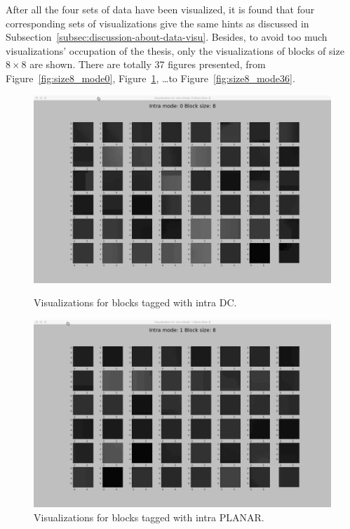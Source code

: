 After all the four sets of data have been visualized,
it is found that four corresponding sets of visualizations
give the same hints as discussed in
Subsection~\ref{subsec:discussion-about-data-visu}.
Besides, to avoid too much visualizations' occupation of the thesis,
only the visualizations of blocks of size $8\times8$
are shown.
There are totally 37 figures presented,
from Figure~\ref{fig:size8_mode0}, Figure~\ref{fig:size8_mode1},
\ldots to Figure~\ref{fig:size8_mode36}.

\begin{figure}[H]
    
        \vspace*{1cm} %
    
        \begin{minipage}{0.49\textwidth}
            \includegraphics[width=\linewidth]{Figures/visu-size8x8/8-0}
            \caption[Visualizations for blocks tagged with intra DC]{Visualizations for blocks tagged with intra DC.}
            \label{fig:size8_mode0}
        \end{minipage}
        \hspace{\fill} %
        \begin{minipage}{0.49\textwidth}
            \includegraphics[width=\linewidth]{Figures/visu-size8x8/8-1}
            \caption[Visualizations for blocks tagged with intra PLANAR]{Visualizations for blocks tagged with intra PLANAR.}
            \label{fig:size8_mode1}
        \end{minipage}
        

\end{figure}
